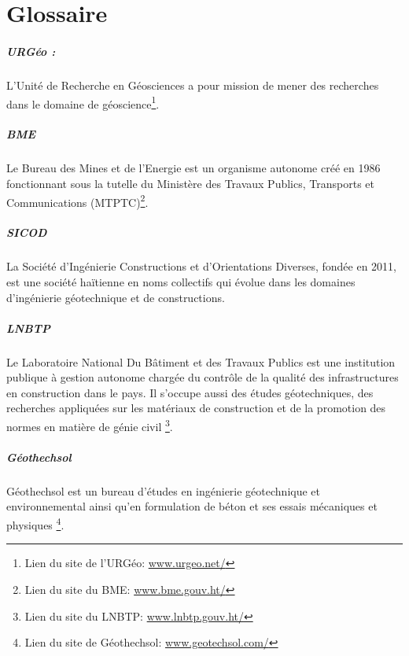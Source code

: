 \chapter*{Glossaire}

\paragraph{URGéo :}
L'Unité de Recherche en Géosciences a pour mission de mener des
recherches dans le domaine de géoscience\footnote{Lien du site de l'URGéo: \url{www.urgeo.net/}}.

\paragraph{BME}
Le Bureau des Mines et de l’Energie est un organisme autonome créé en 
1986 fonctionnant sous la tutelle du Ministère des Travaux Publics, Transports 
et Communications (MTPTC)\footnote{Lien du site du BME: \url{www.bme.gouv.ht/}}. 


\paragraph{SICOD}
La  Société d’Ingénierie Constructions et d’Orientations Diverses,
fondée en 2011, est une société haïtienne en noms collectifs qui évolue dans 
les domaines d’ingénierie géotechnique et de constructions.

\paragraph{LNBTP}
Le Laboratoire National Du Bâtiment et des Travaux Publics est une institution 
publique à gestion autonome chargée du contrôle de
la qualité des infrastructures en construction dans le pays. Il s'occupe 
aussi des études géotechniques, des recherches appliquées sur les matériaux de 
construction et de la promotion des normes en matière de génie civil
\footnote{Lien du site du LNBTP: \url{www.lnbtp.gouv.ht/}}. 


\paragraph{Géothechsol}
Géothechsol est un bureau d’études 
en ingénierie géotechni\-que et environnemental
ainsi qu’en formulation de béton et ses essais mécani\-ques et physiques
\footnote{Lien du site de Géothechsol: \url{www.geotechsol.com/}}.  

